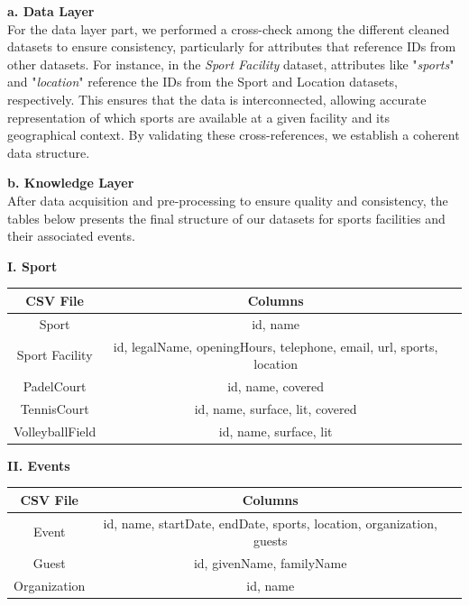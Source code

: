 \noindent\textbf{a. Data Layer\\}
For the data layer part, we performed a cross-check among the different cleaned datasets to ensure consistency, particularly for attributes that reference IDs from other datasets. For instance, in the \textit{Sport Facility} dataset, attributes like "\textit{sports}" and "\textit{location}" reference the IDs from the Sport and Location datasets, respectively. This ensures that the data is interconnected, allowing accurate representation of which sports are available at a given facility and its geographical context. By validating these cross-references, we establish a coherent data structure.

\vspace{0.4cm}

\noindent\textbf{b. Knowledge Layer\\}
After data acquisition and pre-processing to ensure quality and consistency, the tables below presents the final structure of our datasets for sports facilities and their associated events.

\textbf{\normalsize I. Sport}
\vspace{-7pt}
\begin{table}[H]
    \centering
    \begin{tabular}{|c|c|c|}
        \hline
        \textbf{CSV File} & \textbf{Columns} \\ \hline
        Sport & id, name \\ \hline
        Sport Facility & id, legalName, openingHours, telephone, email, url, sports, location \\ \hline
        PadelCourt & id, name, covered \\ \hline
        TennisCourt & id, name, surface, lit, covered \\ \hline
        VolleyballField & id, name, surface, lit \\ \hline
    \end{tabular}
\end{table}

\textbf{\normalsize II. Events}
\vspace{-7pt}
\begin{table}[H]
    \centering
    \begin{tabular}{|c|c|c|}
        \hline
        \textbf{CSV File} & \textbf{Columns} \\ \hline
        Event & id, name, startDate, endDate, sports, location, organization, guests \\ \hline
        Guest & id, givenName, familyName \\ \hline
        Organization & id, name \\ \hline
    \end{tabular}
\end{table}

